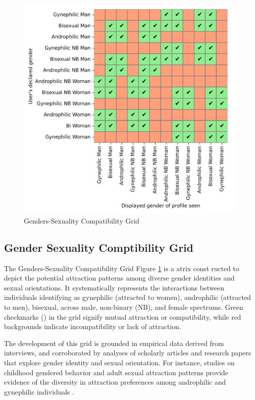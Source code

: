 \begin{figure}[t!]
 \centering
 \includegraphics[scale=0.2]{figures/Analysis and Results/gender_matrix.png}
 \caption{Genders-Sexuality Compatibility Grid}
 \label{fig:img3}
\end{figure}

\subsection{Gender Sexuality Comptibility Grid}
The Genders-Sexuality Compatibility Grid Figure \ref{fig:img3} is a atrix const ructed to depict the potential attraction patterns among diverse gender identities and sexual orientations. It systematically represents the interactions between individuals identifying as gynephilic (attracted to women), androphilic (attracted to men), bisexual, across male, non-binary (NB), and female spectrums. Green checkmarks (\checkmark) in the grid signify mutual attraction or compatibility, while red backgrounds indicate incompatibility or lack of attraction.

The development of this grid is grounded in empirical data derived from interviews, and corroborated by analyses of scholarly articles and research papers that explore gender identity and sexual orientation. For instance, studies on childhood gendered behavior and adult sexual attraction patterns provide evidence of the diversity in attraction preferences among androphilic and gynephilic individuals \cite{Petterson_Wrightson_Vasey_2017}.

